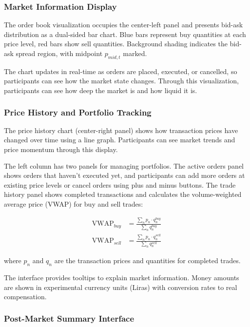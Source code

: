 \subsubsection{Market Information Display}

The order book visualization occupies the center-left panel and presents bid-ask distribution as a dual-sided bar chart. Blue bars represent buy quantities at each price level, red bars show sell quantities. Background shading indicates the bid-ask spread region, with midpoint $p_{mid,t}$ marked.

The chart updates in real-time as orders are placed, executed, or cancelled, so participants can see how the market state changes. Through this visualization, participants can see how deep the market is and how liquid it is.

\subsubsection{Price History and Portfolio Tracking}

The price history chart (center-right panel) shows how transaction prices have changed over time using a line graph. Participants can see market trends and price momentum through this display.

The left column has two panels for managing portfolios. The active orders panel shows orders that haven't executed yet, and participants can add more orders at existing price levels or cancel orders using plus and minus buttons. The trade history panel shows completed transactions and calculates the volume-weighted average price (VWAP) for buy and sell trades:

\begin{align}
\text{VWAP}_{buy} &= \frac{\sum_{n} p_n \cdot q_n^{buy}}{\sum_{n} q_n^{buy}} \label{eq:vwap_buy}\\
\text{VWAP}_{sell} &= \frac{\sum_{n} p_n \cdot q_n^{sell}}{\sum_{n} q_n^{sell}} \label{eq:vwap_sell}
\end{align}

where $p_n$ and $q_n$ are the transaction prices and quantities for completed trades.

The interface provides tooltips to explain market information. Money amounts are shown in experimental currency units (Liras) with conversion rates to real compensation.

\subsubsection{Post-Market Summary Interface}

